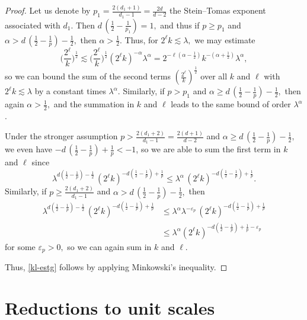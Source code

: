 \documentclass[leqno]{amsart}
\theoremstyle{definition}
\theoremstyle{remark}
\numberwithin{equation}{section}
\newcommand\la{{\lambda}}
\newcommand\ve{{\varepsilon}}
\begin{document}
\begin{proof}
Let us denote by $p_1=\frac{2(d_1+1)}{d_1-1}=\frac{2d}{d-2}$ the Stein--Tomas exponent associated with $d_1.$ Then 
$d \, (\frac{1}{2}-\frac{1}{p_{1}})=1,$ and thus if  $p\ge p_1$ and $\alpha > d \, (\frac{1}{2}-\frac{1}{p})-\frac{1}{2},$ then $\alpha>\frac{1}{2}.$
Thus, for $2^\ell k\lesssim \la,$  we may estimate
\[
\Big(\frac{2^{\ell}}{k}\Big)^{\frac{1}{2}} \lesssim \Big(\frac{2^{\ell}}{k}\Big)^{\frac{1}{2}} (2^\ell k)^{-\alpha}\la^{\alpha}=2^{-\ell(\alpha-\frac 12)} k^{-(\alpha+\frac 12)}\la^{\alpha},
\]
so we can bound the sum  of the second terms  $(\frac{2^{\ell}}{k})^{\frac{1}{2}}$ over all $k$ and $\ell$ with $2^\ell k\lesssim \la$  by a constant times $\la^\alpha.$  Similarly, if $p>p_1$ and $\alpha \ge d \, (\frac{1}{2}-\frac{1}{p})-\frac{1}{2},$ then again $\alpha>\frac{1}{2},$ and the summation in $k$ and $\ell$ leads to the same bound of order $\la^\alpha$.  

Under the stronger assumption $p> \frac{2(d_1+2)}{d_1-1}=\frac{2(d+1)}{d-2}$ and $\alpha \ge d \, (\frac{1}{2}-\frac{1}{p})-\frac{1}{2},$ we even have  $-d\,(\frac 12 - \frac 1p ) + \frac1p < -1$, so we are able to sum the first term in $k$ and $\ell$ since
\[
\lambda^{d(\frac 12 - \frac 1p )-\frac 12} \, (2^\ell k)^{-d(\frac 12 - \frac 1p)+\frac 1p}\le \lambda^{\alpha}\, (2^\ell k)^{-d(\frac 12 - \frac 1p)+\frac 1p}.
\]
Similarly, if $p\ge \frac{2(d_1+2)}{d_1-1}$ and $\alpha > d \, (\frac{1}{2}-\frac{1}{p})-\frac{1}{2},$ then 
\begin{align*}
\lambda^{d(\frac 12 - \frac 1p )-\frac 12} \, (2^\ell k)^{-d(\frac 12 - \frac 1p)+\frac 1p}
& \le \lambda^{\alpha}\la^{-\ve_p}\, (2^\ell k)^{-d(\frac 12 - \frac 1p)+\frac 1p} \\
& \le \la^\alpha (2^\ell k)^{-d(\frac 12 - \frac 1p)+\frac 1p-\ve_p}
\end{align*}
for some $\ve_p>0,$ so we can again sum in $k$ and $\ell$.

Thus, \eqref{kl-estg} follows by applying Minkowski's inequality.
\end{proof} 

\section{Reductions to unit scales} \label{main-est-kl}
\end{document}
